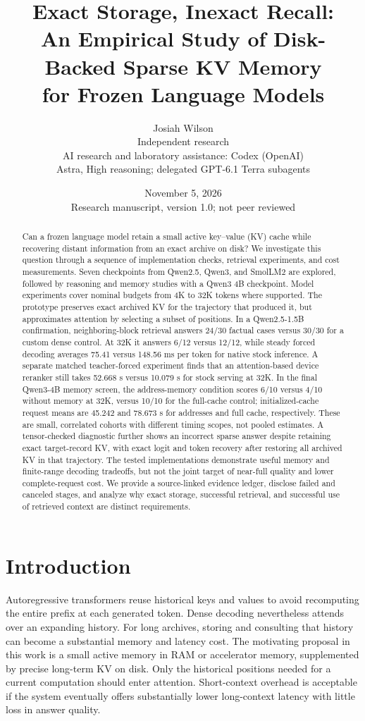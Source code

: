\documentclass[11pt,letterpaper]{article}
\title{Exact Storage, Inexact Recall:\\An Empirical Study of Disk-Backed Sparse KV Memory\\for Frozen Language Models}
\author{Josiah Wilson\\\small Independent research\\[0.5em]
\small AI research and laboratory assistance: Codex (OpenAI)\\
\small Astra, High reasoning; delegated GPT-6.1 Terra subagents}
\date{November 5, 2026\\\small Research manuscript, version 1.0; not peer reviewed}
\begin{document}
\maketitle
\begin{abstract}
Can a frozen language model retain a small active key--value (KV) cache while recovering distant information from an exact archive on disk? We investigate this question through a sequence of implementation checks, retrieval experiments, and cost measurements. Seven checkpoints from Qwen2.5, Qwen3, and SmolLM2 are explored, followed by reasoning and memory studies with a Qwen3 4B checkpoint. Model experiments cover nominal budgets from 4K to 32K tokens where supported. The prototype preserves exact archived KV for the trajectory that produced it, but approximates attention by selecting a subset of positions. In a Qwen2.5-1.5B confirmation, neighboring-block retrieval answers 24/30 factual cases versus 30/30 for a custom dense control. At 32K it answers 6/12 versus 12/12, while steady forced decoding averages 75.41 versus 148.56 ms per token for native stock inference. A separate matched teacher-forced experiment finds that an attention-based device reranker still takes 52.668 s versus 10.079 s for stock serving at 32K. In the final Qwen3-4B memory screen, the address-memory condition scores 6/10 versus 4/10 without memory at 32K, versus 10/10 for the full-cache control; initialized-cache request means are 45.242 and 78.673 s for addresses and full cache, respectively. These are small, correlated cohorts with different timing scopes, not pooled estimates. A tensor-checked diagnostic further shows an incorrect sparse answer despite retaining exact target-record KV, with exact logit and token recovery after restoring all archived KV in that trajectory. The tested implementations demonstrate useful memory and finite-range decoding tradeoffs, but not the joint target of near-full quality and lower complete-request cost. We provide a source-linked evidence ledger, disclose failed and canceled stages, and analyze why exact storage, successful retrieval, and successful use of retrieved context are distinct requirements.
\end{abstract}

\section{Introduction}
Autoregressive transformers reuse historical keys and values to avoid recomputing the entire prefix at each generated token. Dense decoding nevertheless attends over an expanding history. For long archives, storing and consulting that history can become a substantial memory and latency cost. The motivating proposal in this work is a small active memory in RAM or accelerator memory, supplemented by precise long-term KV on disk. Only the historical positions needed for a current computation should enter attention. Short-context overhead is acceptable if the system eventually offers substantially lower long-context latency with little loss in answer quality.
\end{document}

